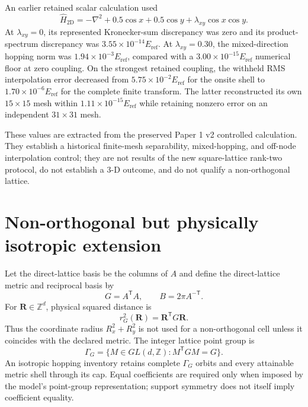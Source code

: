\documentclass[11pt]{article}
\newcommand{\Z}{\mathbb Z}
\begin{document}
An earlier retained scalar calculation used
\begin{equation}
 \widehat H_{2\mathrm D}=-\nabla^2+0.5\cos x+0.5\cos y
 +\lambda_{xy}\cos x\cos y.
 \label{eq:legacy-2d}
\end{equation}
At $\lambda_{xy}=0$, its represented Kronecker-sum discrepancy was zero and its
product-spectrum discrepancy was $3.55\times10^{-14}E_{\mathrm{ref}}$. At $\lambda_{xy}=0.30$, the
mixed-direction hopping norm was $1.94\times10^{-3}E_{\mathrm{ref}}$, compared with a
$3.00\times10^{-15}E_{\mathrm{ref}}$ numerical floor at zero coupling. On the strongest retained
coupling, the withheld RMS interpolation error decreased from
$5.75\times10^{-2}E_{\mathrm{ref}}$ for the onsite shell to $1.70\times10^{-6}E_{\mathrm{ref}}$ for the complete
finite transform. The latter reconstructed its own $15\times15$ mesh within
$1.11\times10^{-15}E_{\mathrm{ref}}$ while retaining nonzero error on an independent
$31\times31$ mesh.

These values are extracted from the preserved Paper 1 v2 controlled calculation. They
establish a historical finite-mesh separability, mixed-hopping, and off-node
interpolation control; they are not results of the new square-lattice rank-two protocol,
do not establish a 3-D outcome, and do not qualify a non-orthogonal lattice.

\section{Non-orthogonal but physically isotropic extension}

Let the direct-lattice basis be the columns of $A$ and define the direct-lattice metric
and reciprocal basis by
\begin{equation}
 G=A^{\mathsf T}A,
 \qquad B=2\pi A^{-\mathsf T}.
\end{equation}
For $\mathbf R\in\Z^d$, physical squared distance is
\begin{equation}
 r_G^2(\mathbf R)=\mathbf R^{\mathsf T}G\mathbf R.
 \label{eq:metric-radius}
\end{equation}
Thus the coordinate radius $R_x^2+R_y^2$ is not used for a non-orthogonal cell unless it
coincides with the declared metric. The integer lattice point group is
\begin{equation}
 \Gamma_G=\{M\in GL(d,\Z):M^{\mathsf T}GM=G\}.
 \label{eq:metric-group}
\end{equation}
An isotropic hopping inventory retains complete $\Gamma_G$ orbits and every attainable
metric shell through its cap. Equal coefficients are required only when imposed by the
model's point-group representation; support symmetry does not itself imply coefficient
equality.
\end{document}
